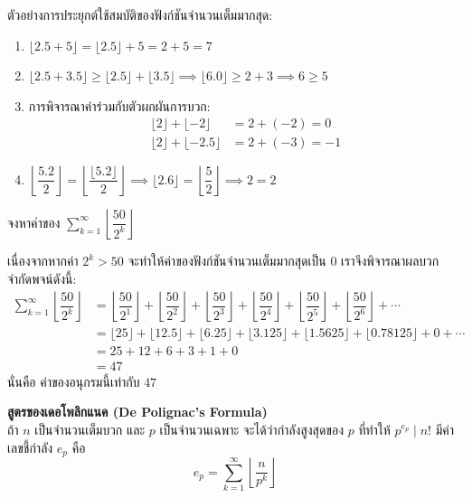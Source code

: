 \newpage
\begin{examplebox}
	ตัวอย่างการประยุกต์ใช้สมบัติของฟังก์ชันจำนวนเต็มมากสุด:
	\begin{enumerate}
		\item $\lfloor 2.5 + 5 \rfloor = \lfloor 2.5 \rfloor + 5 = 2 + 5 = 7$
		\item $\lfloor 2.5 + 3.5 \rfloor \geq \lfloor 2.5 \rfloor + \lfloor 3.5 \rfloor \implies \lfloor 6.0 \rfloor \geq 2 + 3 \implies 6 \geq 5$
		\item การพิจารณาค่าร่วมกับตัวผกผันการบวก:
		\begin{align*}
			\lfloor 2 \rfloor + \lfloor -2 \rfloor &= 2 + (-2) = 0 \\
			\lfloor 2 \rfloor + \lfloor -2.5 \rfloor &= 2 + (-3) = -1
		\end{align*}
		\item $\left\lfloor \dfrac{5.2}{2} \right\rfloor = \left\lfloor \dfrac{\lfloor 5.2 \rfloor}{2} \right\rfloor \implies \lfloor 2.6 \rfloor = \left\lfloor \dfrac{5}{2} \right\rfloor \implies 2 = 2$
	\end{enumerate}
\end{examplebox}

\begin{examplebox}
	จงหาค่าของ $\displaystyle \sum_{k=1}^{\infty} \left\lfloor \dfrac{50}{2^k} \right\rfloor$ 
\end{examplebox}
	\solution เนื่องจากหากค่า $2^k > 50$ จะทำให้ค่าของฟังก์ชันจำนวนเต็มมากสุดเป็น $0$ เราจึงพิจารณาผลบวกจำกัดพจน์ดังนี้:
\begin{align*}
	\sum_{k=1}^{\infty} \left\lfloor \dfrac{50}{2^k} \right\rfloor &= \left\lfloor \dfrac{50}{2^1} \right\rfloor + \left\lfloor \dfrac{50}{2^2} \right\rfloor + \left\lfloor \dfrac{50}{2^3} \right\rfloor + \left\lfloor \dfrac{50}{2^4} \right\rfloor + \left\lfloor \dfrac{50}{2^5} \right\rfloor + \left\lfloor \dfrac{50}{2^6} \right\rfloor + \cdots \\
	&= \lfloor 25 \rfloor + \lfloor 12.5 \rfloor + \lfloor 6.25 \rfloor + \lfloor 3.125 \rfloor + \lfloor 1.5625 \rfloor + \lfloor 0.78125 \rfloor + 0 + \cdots \\
	&= 25 + 12 + 6 + 3 + 1 + 0 \\
	&= 47
\end{align*}
นั่นคือ ค่าของอนุกรมนี้เท่ากับ $47$

\newpage
\begin{theorembox}
	\textbf{สูตรของเดอโพลิกแนค (De Polignac's Formula)} \\
	ถ้า $n$ เป็นจำนวนเต็มบวก และ $p$ เป็นจำนวนเฉพาะ จะได้ว่ากำลังสูงสุดของ $p$ ที่ทำให้ $p^{e_p} \mid n!$ มีค่าเลขชี้กำลัง $e_p$ คือ
	\[ e_p = \sum_{k=1}^{\infty} \left\lfloor \dfrac{n}{p^k} \right\rfloor \]
\end{theorembox}

